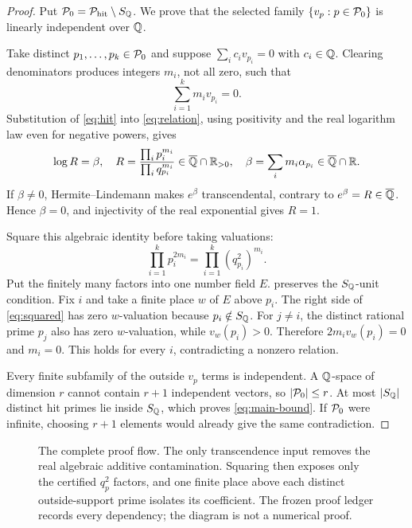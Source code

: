 \documentclass[11pt]{article}
\theoremstyle{definition}
\theoremstyle{remark}
\begin{document}
\begin{proof}
Put $\mathcal P_0=\mathcal P_{\mathrm{hit}}\setminus S_{\mathbb Q}$.  We prove that the selected family
$\{v_p:p\in\mathcal P_0\}$ is linearly independent over $\mathbb Q$.

Take distinct $p_1,\ldots,p_k\in\mathcal P_0$ and suppose
$\sum_i c_i v_{p_i}=0$ with $c_i\in\mathbb Q$.  Clearing denominators produces
integers $m_i$, not all zero, such that
\begin{equation}
 \sum_{i=1}^k m_i v_{p_i}=0.
 \label{eq:relation}
\end{equation}
Substitution of \eqref{eq:hit} into \eqref{eq:relation}, using positivity and
the real logarithm law even for negative powers, gives
\begin{equation}
 \log R=\beta,
 \quad
 R=\frac{\prod_i p_i^{m_i}}{\prod_iq_{p_i}^{m_i}}
   \in\overline{\mathbb Q}\cap\mathbb R_{>0},
 \quad
 \beta=\sum_i m_i\alpha_{p_i}\in\overline{\mathbb Q}\cap\mathbb R.
 \label{eq:logR}
\end{equation}
If $\beta\neq0$, Hermite--Lindemann makes $e^\beta$ transcendental, contrary
to $e^\beta=R\in\overline{\mathbb Q}$.  Hence $\beta=0$, and injectivity of the real
exponential gives $R=1$.

Square this algebraic identity before taking valuations:
\begin{equation}
 \prod_{i=1}^k p_i^{2m_i}
 =\prod_{i=1}^k(q_{p_i}^2)^{m_i}.
 \label{eq:squared}
\end{equation}
Put the finitely many factors into one number field $E$.
 preserves the $S_{\mathbb Q}$-unit condition.  Fix $i$ and take a
finite place $w$ of $E$ above $p_i$.  The right side of
\eqref{eq:squared} has zero $w$-valuation because $p_i\notin S_{\mathbb Q}$.
For $j\neq i$, the distinct rational prime $p_j$ also has zero
$w$-valuation, while $v_w(p_i)>0$.  Therefore
$2m_i v_w(p_i)=0$ and $m_i=0$.  This holds for every $i$, contradicting a
nonzero relation.

Every finite subfamily of the outside $v_p$ terms is independent.  A
$\mathbb Q$-space of dimension $r$ cannot contain $r+1$ independent vectors, so
$|\mathcal P_0|\leq r$.  At most $|S_{\mathbb Q}|$ distinct hit primes lie inside $S_{\mathbb Q}$,
which proves \eqref{eq:main-bound}.  If $\mathcal P_0$ were infinite, choosing
$r+1$ elements would already give the same contradiction.
\end{proof}

\begin{figure}[t]
  \centering
  \ProofFlowFigure
  \caption{The complete proof flow.  The only transcendence input removes
  the real algebraic additive contamination.  Squaring then exposes only the
  certified $q_p^2$ factors, and one finite place above each distinct
  outside-support prime isolates its coefficient.  The frozen proof ledger
  records every dependency; the diagram is not a numerical proof.}
  \label{fig:proof-flow}
\end{figure}
\end{document}
